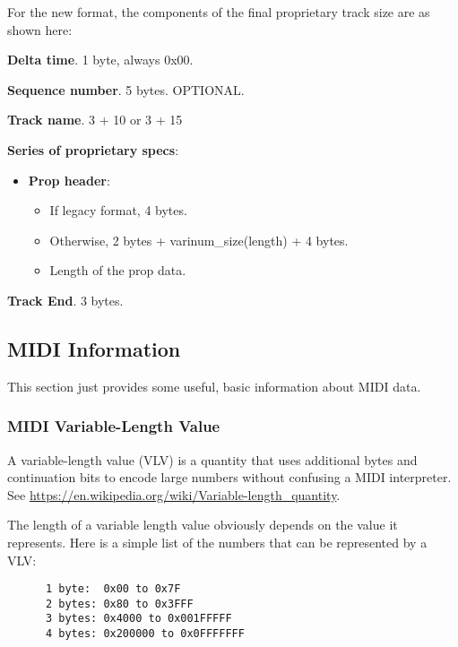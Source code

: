For the new format, the components of the final proprietary track size are
as shown here:

   \begin{enumber}
      \item \textbf{Delta time}.  1 byte, always 0x00.
      \item \textbf{Sequence number}.  5 bytes.  OPTIONAL.
      \item \textbf{Track name}. 3 + 10 or 3 + 15
      \item \textbf{Series of proprietary specs}:
      \begin{itemize}
         \item \textbf{Prop header}:
         \begin{itemize}
            \item If legacy format, 4 bytes.
            \item Otherwise, 2 bytes + varinum\_size(length) + 4 bytes.
            \item Length of the prop data.
         \end{itemize}
      \end{itemize}
      \item \textbf{Track End}. 3 bytes.
   \end{enumber}

\subsection{MIDI Information}
\label{subsec:midi_information}

   This section just provides some useful, basic information about MIDI
   data.

\subsubsection{MIDI Variable-Length Value}
\label{subsubsec:midi_variable_length_value}

   A variable-length value (VLV) is a quantity that uses additional bytes
   and continuation bits to encode large numbers without confusing a MIDI
   interpreter.
   See \url{https://en.wikipedia.org/wiki/Variable-length\_quantity}.

   The length of a variable length value obviously depends on the value it
   represents.  Here is a simple list of the numbers that can be represented
   by a VLV:

   \begin{verbatim}
      1 byte:  0x00 to 0x7F
      2 bytes: 0x80 to 0x3FFF
      3 bytes: 0x4000 to 0x001FFFFF
      4 bytes: 0x200000 to 0x0FFFFFFF
   \end{verbatim}

